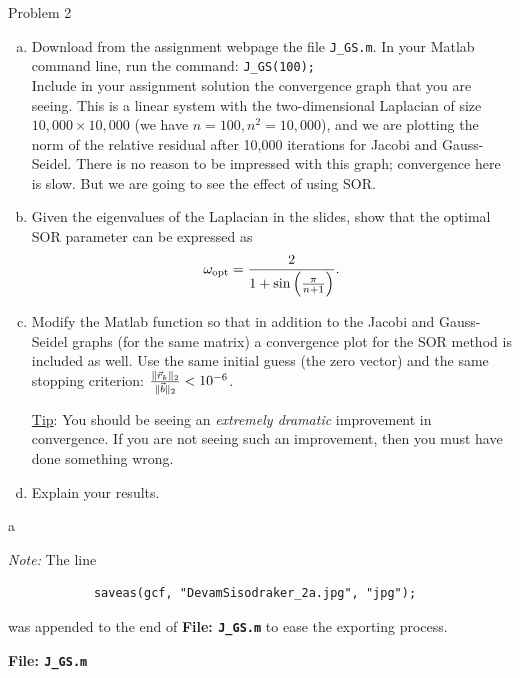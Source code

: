 \begin{section}{Problem 2}
    \begin{problem}{2}
        \begin{enumerate}[(a)]
            \item Download from the assignment webpage the file {\tt J\_GS.m}. In your {\sc Matlab} command line, run the command: {\tt J\_GS(100);} \\
            Include in your assignment solution the convergence graph that you are seeing. This is a linear system with the two-dimensional Laplacian of size $10,000 \times 10,000$ (we have $n=100, n^2=10,000$), and we are plotting the norm of the relative residual after 10,000 iterations for Jacobi and Gauss-Seidel. There is no reason to be impressed with this graph; convergence here is slow. But we are going to see  the effect of using SOR.
            \item Given the eigenvalues of the Laplacian in the slides, show that the optimal SOR parameter can be expressed as
            $$ \omega_{\rm opt} = \frac{2}{1+\sin \left( \frac{\pi}{n+1} \right)}.$$
            \item
            Modify the  {\sc Matlab} function so that in addition to the Jacobi and Gauss-Seidel graphs (for the same matrix) a convergence plot for the SOR method is included as well. Use the same initial guess (the zero vector) and the same stopping criterion: $\frac{\| \vec{r}_k \|_2}{\| \vec{b} \|_2} < 10^{-6}$. 
            
            {\underline {Tip}:} You should be seeing an {\em extremely dramatic} improvement in convergence. If you are not seeing such an improvement, then you must have done something wrong.
            \item Explain your results. 
        \end{enumerate}
    \end{problem}

    \newpage

    \begin{solution}{a}

        \textit{Note:} The line \begin{verbatim}
            saveas(gcf, "DevamSisodraker_2a.jpg", "jpg");
        \end{verbatim} 
        was appended to the end of \textbf{File: {\tt J\_GS.m}} to ease the exporting process.
        \begin{mdframed}
            \footnotesize
            \textbf{File: {\tt J\_GS.m}}
            \inputminted{matlab}{J_GS.m}
            \normalfont
        \end{mdframed}


\end{solution}
\end{section}
